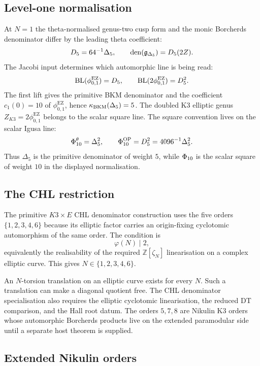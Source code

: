 \subsection*{Level-one normalisation}

At $N=1$ the theta-normalised genus-two cusp form and the monic
Borcherds denominator differ by the leading theta coefficient:
\[
  D_5=64^{-1}\Delta_5,\qquad
  \operatorname{den}(\mathfrak g_{\Delta_5})=D_5(2Z).
\]
The Jacobi input determines which automorphic line is being read:
\[
  \mathrm{BL}(\phi_{0,1}^{\mathrm{EZ}})=D_5,\qquad
  \mathrm{BL}(2\phi_{0,1}^{\mathrm{EZ}})=D_5^2.
\]
The first lift gives the primitive BKM denominator and the coefficient
$c_1(0)=10$ of $\phi_{0,1}^{\mathrm{EZ}}$, hence
$\kappa_{\mathrm{BKM}}(\Delta_5)=5$. The doubled K3 elliptic genus
$Z_{K3}=2\phi_{0,1}^{\mathrm{EZ}}$ belongs to the scalar square line.
The square convention lives on the scalar Igusa line:
\[
  \Phi_{10}^\theta=\Delta_5^2,\qquad
  \Phi_{10}^{\mathrm{OP}}=D_5^2=4096^{-1}\Delta_5^2.
\]
Thus $\Delta_5$ is the primitive denominator of weight $5$, while
$\Phi_{10}$ is the scalar square of weight $10$ in the displayed
normalisation.

\subsection*{The CHL restriction}

The primitive $K3\times E$ CHL denominator construction uses the five
orders $\{1,2,3,4,6\}$ because its elliptic factor carries an
origin-fixing cyclotomic automorphism of the same order. The condition is
\[
  \varphi(N)\mid 2,
\]
equivalently the realisability of the required $\mathbb Z[\zeta_N]$
linearisation on a complex elliptic curve. This gives
$N\in\{1,2,3,4,6\}$.

An $N$-torsion translation on an elliptic curve exists for every
$N$. Such a translation can make a diagonal quotient free. The CHL
denominator specialisation also requires the elliptic cyclotomic
linearisation, the reduced DT comparison, and the Hall root datum. The
orders $5,7,8$ are Nikulin K3 orders whose automorphic Borcherds
products live on the extended paramodular side until a separate host
theorem is supplied.

\subsection*{Extended Nikulin orders}

